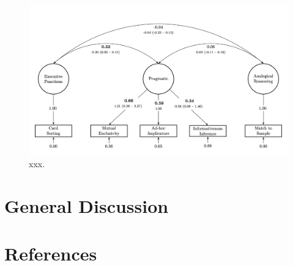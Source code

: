 \documentclass[
  english,
  man,floatsintext]{apa6}
\begin{document}
\begin{figure}

{\centering \includegraphics[width=1\linewidth]{./figures/figure5} 

}

\caption{xxx.}\label{fig:fig5}
\end{figure}

\hypertarget{general-discussion}{%
\section{General Discussion}\label{general-discussion}}

\newpage

\hypertarget{references}{%
\section{References}\label{references}}

\begingroup
\setlength{\parindent}{-0.5in}
\setlength{\leftskip}{0.5in}
\end{document}
